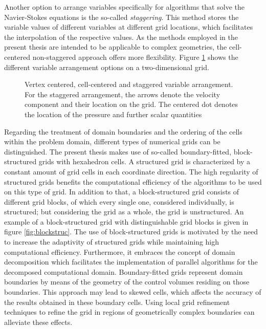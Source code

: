 Another option to arrange variables specifically for algorithms that solve the Navier-Stokes equations is the so-called \emph{staggering}. This method stores the variable values of different variables at different grid locations, which facilitates the interpolation of the respective values. As the methods employed in the present thesis are intended to be applicable to complex geometries, the cell-centered non-staggered approach offers more flexibility.  Figure \ref{fig:cell vertex} shows the different variable arrangement options on a two-dimensional grid.

\begin{figure}[h!]
    \hfil
    \hfil
    \caption{Vertex centered, cell-centered and staggered variable arrangement. For the staggered arrangement, the arrows denote the velocity component and their location on the grid. The centered dot denotes the location of the pressure and further scalar quantities}
   \label{fig:cell vertex}
\end{figure}

Regarding the treatment of domain boundaries and the ordering of the cells within the problem domain, different types of numerical grids can be distinguished. The present thesis makes use of so-called boundary-fitted, block-structured grids with hexahedron cells. A structured grid is characterized by a constant amount of grid cells in each coordinate direction. The high regularity of structured grids benefits the computational efficiency of the algorithms to be used on this type of grid. In addition to that, a block-structured grid consists of different grid blocks, of which every single one, considered individually, is structured; but considering the grid as a whole, the grid is unstructured. An example of a block-structured grid with distinguishable grid blocks is given in figure \ref{fig:blockstruc}. The use of block-structured grids is motivated by the need to increase the adaptivity of structured grids while maintaining high computational efficiency. Furthermore, it embraces the concept of domain decomposition which facilitates the implementation of parallel algorithms for the decomposed computational domain. Boundary-fitted grids represent domain boundaries by means of the geometry of the control volumes residing on those boundaries. This approach may lead to skewed cells, which affects the accuracy of the results obtained in these boundary cells. Using local grid refinement techniques to refine the grid in regions of geometrically complex boundaries can alleviate these effects.

